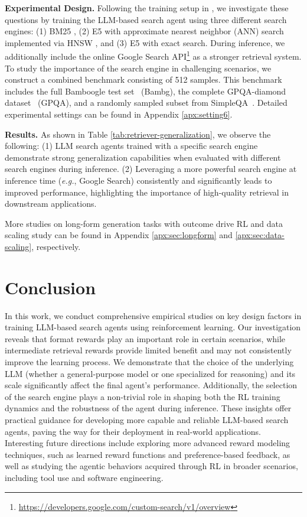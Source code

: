 \textbf{Experimental Design.}
Following the training setup in \cite{jin2025search}, we investigate these questions by training the LLM-based search agent using three different search engines: 
(1) BM25 \cite{robertson2009probabilistic}, 
(2) E5 \cite{wang2022text} with approximate nearest neighbor (ANN) search implemented via HNSW \cite{malkov2018efficient}, and 
(3) E5 with exact search. 
During inference, we additionally include the online Google Search API\footnote{\url{https://developers.google.com/custom-search/v1/overview}} as a stronger retrieval system. 
To study the importance of the search engine in challenging scenarios, we construct a combined benchmark consisting of 512 samples. This benchmark includes the full Bamboogle test set~\cite{press2022measuring} (Bambg), the complete GPQA-diamond dataset~\cite{rein2024gpqa} (GPQA), and a randomly sampled subset from SimpleQA~\cite{wei2024measuring}.
Detailed experimental settings can be found in Appendix \ref{apx:setting6}.

\textbf{Results.}
As shown in Table \ref{tab:retriever-generalization}, we observe the following:
(1) LLM search agents trained with a specific search engine demonstrate strong generalization capabilities when evaluated with different search engines during inference.
(2) Leveraging a more powerful search engine at inference time (\textit{e.g.}, Google Search) consistently and significantly leads to improved performance, highlighting the importance of high-quality retrieval in downstream applications.

More studies on long-form generation tasks with outcome drive RL and data scaling study can be found in Appendix \ref{apx:sec:longform} and \ref{apx:sec:data-scaling}, respectively.

\section{Conclusion}
In this work, we conduct comprehensive empirical studies on key design factors in training LLM-based search agents using reinforcement learning. 
Our investigation reveals that format rewards play an important role in certain scenarios, while intermediate retrieval rewards provide limited benefit and may not consistently improve the learning process.
We demonstrate that the choice of the underlying LLM (whether a general-purpose model or one specialized for reasoning) and its scale significantly affect the final agent’s performance. 
Additionally, the selection of the search engine plays a non-trivial role in shaping both the RL training dynamics and the robustness of the agent during inference. 
These insights offer practical guidance for developing more capable and reliable LLM-based search agents, paving the way for their deployment in real-world applications.
Interesting future directions include exploring more advanced reward modeling techniques, such as learned reward functions and preference-based feedback, as well as studying the agentic behaviors acquired through RL in broader scenarios, including tool use and software engineering.

